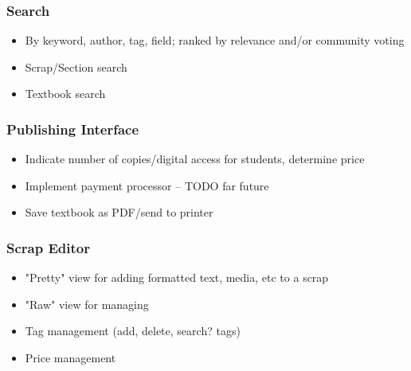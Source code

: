 \documentclass[letterpaper, 10pt, draftclsnofoot, onecolumn]{IEEEtran}
\begin{document}
{{{\subsubsection[System feature 4: [ insert feature name here
{]}]{\rmfamily\bfseries\color{black} Search
}
\begin{itemize}
\item By keyword, author, tag, field; ranked by relevance and/or community voting
\item Scrap/Section search
\item Textbook search
\end{itemize}

\subsubsection[System feature 5: [ Publishing Interface
{]}]{\rmfamily\bfseries\color{black} Publishing Interface
}
\begin{itemize}
\item Indicate number of copies/digital access for students, determine price
\item Implement payment processor -- TODO far future
\item Save textbook as PDF/send to printer
\end{itemize}

\subsubsection[System feature 6: [ Scrap Editor
{]}]{\rmfamily\bfseries\color{black}  Scrap Editor}
\begin{itemize}
\item "Pretty" view for adding formatted text, media, etc to a scrap
\item "Raw" view for managing
\item Tag management (add, delete, search? tags)
\item Price management
\end{itemize}

\bigskip

}}}
\end{document}
